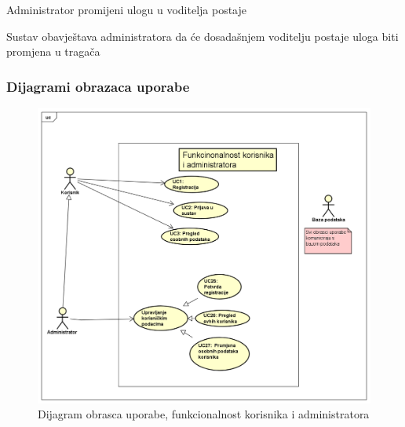 \begin{packed_item}
\begin{packed_item}
\begin{packed_item}
\begin{packed_item}
							\item[4.b] Administrator promijeni ulogu u voditelja postaje
							\item[] \begin{packed_enum}
								
								\item Sustav obavještava administratora da će dosadašnjem voditelju postaje uloga biti promjena u tragača
								
							\end{packed_enum}
							
						\end{packed_item}
					\end{packed_item}
					
				\eject
					
					
				\subsubsection{Dijagrami obrazaca uporabe}
					\begin{figure}[H]
						\includegraphics[scale=0.4]{dijagrami/Korisnik-admin_dijagram.png} 
						\centering
						\caption{Dijagram obrasca uporabe, funkcionalnost korisnika i administratora}
						\label{fig:promjene}
					\end{figure}	
					

\end{packed_item}
\end{packed_item}
